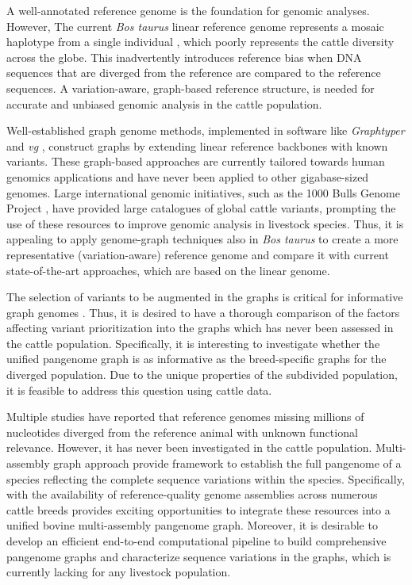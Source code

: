 \documentclass[../main.tex]{subfiles}
\begin{document}
A well-annotated reference genome is the foundation for genomic analyses. However, The current \emph{Bos taurus} linear reference genome represents a mosaic haplotype  from a single individual \citep{rosen2020novo}, which poorly represents the cattle diversity across the globe. This inadvertently introduces reference bias when DNA sequences that are diverged from the reference are compared to the reference sequences. A variation-aware, graph-based reference structure, is needed for accurate and unbiased genomic analysis in the cattle population. 

Well-established graph genome methods, implemented in software like \emph{Graphtyper} \citep{eggertsson2017graphtyper} and \emph{vg}\citep{garrison2018variation} , construct graphs by extending linear reference backbones with known variants. These graph-based approaches are currently tailored towards human genomics applications and have never been applied  to other gigabase-sized genomes. Large international genomic initiatives, such as the 1000 Bulls Genome Project \citep{hayes20191000}, have provided large catalogues of global cattle variants, prompting the use of these resources to improve genomic analysis in livestock species. Thus, it is appealing to apply genome-graph techniques also in \emph{Bos taurus} to create a more representative (variation-aware) reference genome and compare it with current state-of-the-art approaches, which are based on the linear genome.

The selection of variants to be augmented in the graphs is critical for informative graph genomes \citep{pritt2018forge}. Thus, it is desired to have a thorough comparison of the factors affecting variant prioritization into the graphs which has never been assessed in the cattle population. Specifically, it is interesting to investigate whether the unified pangenome graph is as informative as the breed-specific graphs for the diverged population. Due to the unique properties of the subdivided population, it is feasible to address this question using cattle data. 

Multiple studies \citep{sherman2019assembly,li2017comprehensive,ameur2018novo} have reported that reference genomes missing millions of nucleotides diverged from the reference animal with unknown functional relevance. However, it has never been investigated in the cattle population. Multi-assembly graph approach provide framework to establish the full pangenome of a species reflecting the complete sequence variations within the species. Specifically, with the availability of reference-quality genome assemblies across numerous cattle breeds \citep{rice2020continuous,koren2018novo,rosen2020novo} provides exciting opportunities to integrate these resources into a unified bovine multi-assembly pangenome graph. Moreover, it is desirable to develop an efficient end-to-end computational pipeline to build comprehensive pangenome graphs and characterize sequence variations in the graphs, which is currently lacking for any livestock population.
\end{document}

